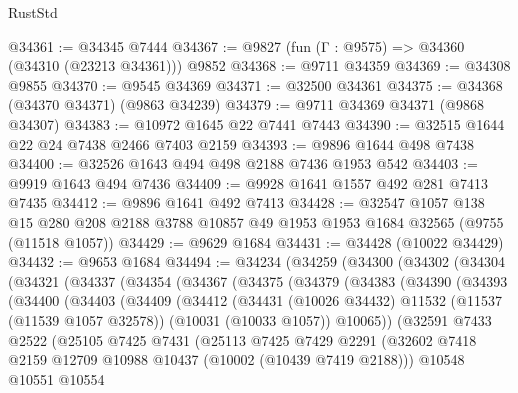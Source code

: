 \begin{lexlean}{RustStd}
\begin{coremodule}
@34361 := @34345 @7444
@34367 := @9827 (fun (Γ : @9575) => @34360 (@34310 (@23213 @34361))) @9852
@34368 := @9711 @34359
@34369 := @34308 @9855
@34370 := @9545 @34369
@34371 := @32500 @34361
@34375 := @34368 (@34370 @34371) (@9863 @34239)
@34379 := @9711 @34369 @34371 (@9868 @34307)
@34383 := @10972 @1645 @22 @7441 @7443
@34390 := @32515 @1644 @22 @24 @7438 @2466 @7403 @2159
@34393 := @9896 @1644 @498 @7438
@34400 := @32526 @1643 @494 @498 @2188 @7436 @1953 @542
@34403 := @9919 @1643 @494 @7436
@34409 := @9928 @1641 @1557 @492 @281 @7413 @7435
@34412 := @9896 @1641 @492 @7413
@34428 := @32547
    @1057
    @138
    @15
    @280
    @208
    @2188
    @3788
    @10857
    @49
    @1953
    @1953
    @1684
    @32565
    (@9755 (@11518 @1057))
@34429 := @9629 @1684
@34431 := @34428 (@10022 @34429)
@34432 := @9653 @1684
@34494 := @34234
    (@34259
      (@34300
        (@34302
          (@34304
            (@34321
              (@34337
                (@34354
                  (@34367
                    (@34375
                      (@34379
                        (@34383
                          (@34390
                            (@34393
                              (@34400
                                (@34403
                                  (@34409
                                    (@34412
                                      (@34431
                                        (@10026 @34432)
                                        @11532
                                        (@11537 (@11539 @1057 @32578))
                                        (@10031 (@10033 @1057))
                                        @10065))
                                    (@32591
                                      @7433
                                      @2522
                                      (@25105
                                        @7425
                                        @7431
                                        (@25113
                                          @7425
                                          @7429
                                          @2291
                                          (@32602
                                            @7418
                                            @2159
                                            @12709
                                            @10988
                                            @10437
                                            (@10002 (@10439 @7419 @2188)))
                                          @10548
                                          @10551
                                          @10554

\end{coremodule}
\end{lexlean}
